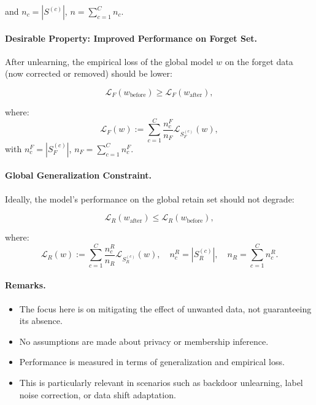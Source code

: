 \documentclass{article} %
\begin{document}
and $n_c = |S^{(c)}|$, $n = \sum_{c=1}^C n_c$.

\paragraph{Desirable Property: Improved Performance on Forget Set.} After unlearning, the empirical loss of the global model $w$ on the forget data (now corrected or removed) should be lower:

\[
\mathcal{L}_{F}(w_{\text{before}}) \geq \mathcal{L}_{F}(w_{\text{after}}),
\]

where:
\[
\mathcal{L}_{F}(w) := \sum_{c=1}^C \frac{n_c^F}{n_F} \mathcal{L}_{S_{F}^{(c)}}(w),
\]
with $n_c^F = |S_{F}^{(c)}|$, $n_F = \sum_{c=1}^C n_c^F$.

\paragraph{Global Generalization Constraint.} Ideally, the model’s performance on the global retain set should not degrade:

\[
\mathcal{L}_{R}(w_{\text{after}}) \leq \mathcal{L}_{R}(w_{\text{before}}),
\]

where:
\[
\mathcal{L}_{R}(w) := \sum_{c=1}^C \frac{n_c^R}{n_R} \mathcal{L}_{S_{R}^{(c)}}(w),
\quad n_c^R = |S_{R}^{(c)}|, \quad n_R = \sum_{c=1}^C n_c^R.
\]

\paragraph{Remarks.}
\begin{itemize}
    \item The focus here is on mitigating the effect of unwanted data, not guaranteeing its absence.
    \item No assumptions are made about privacy or membership inference.
    \item Performance is measured in terms of generalization and empirical loss.
    \item This is particularly relevant in scenarios such as backdoor unlearning, label noise correction, or data shift adaptation.
\end{itemize}
\end{document}
